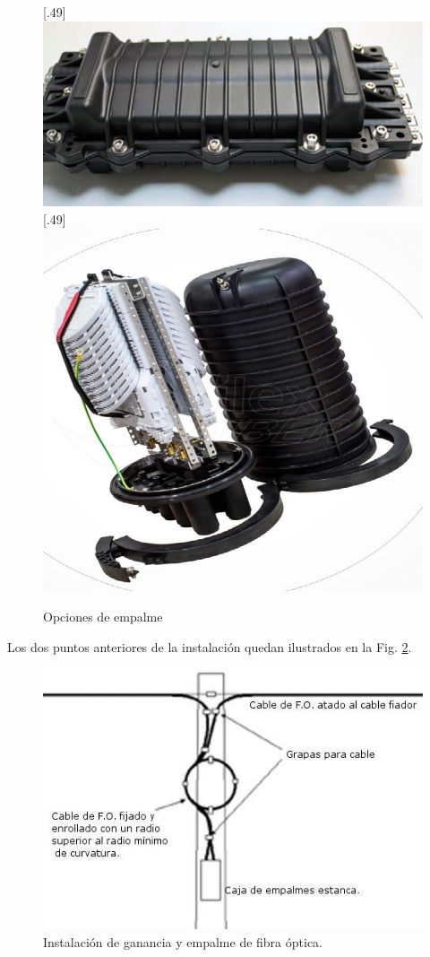 \documentclass[11pt,a4paper]{article}
\begin{document}
\begin{figure}[ht!]
  \centering
  [.49\linewidth]{\includegraphics[height=7\baselineskip]{fotos_ema/caja_empalme.jpg}}
  \hfill
  [.49\linewidth]{\includegraphics[height=7\baselineskip]{fotos_ema/cierres_empalma.jpg}}
  \caption{Opciones de empalme}
  \label{fig:opciones_empalme}
\end{figure}


Los dos puntos anteriores de la instalación quedan ilustrados en la Fig. \ref{fig:inst_gan_emp_fo}.


\begin{figure}[htbp]
  \centering
  \includegraphics[width=0.35\linewidth]{fotos_ema/inst_gan_emp_fo.jpg}
  \caption{Instalación de ganancia y empalme de fibra óptica.}
  \label{fig:inst_gan_emp_fo}
\end{figure}
 
\end{document}
